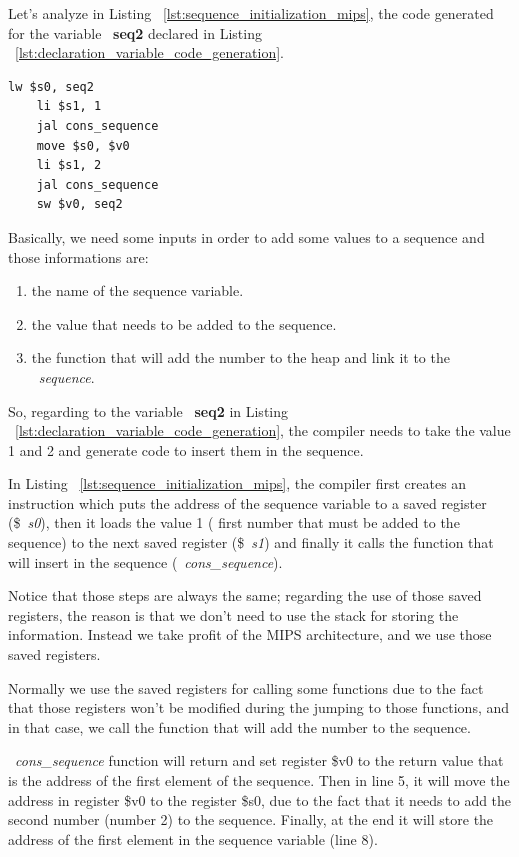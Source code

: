\documentclass[
  oneside,
  11pt, a4paper,
  footinclude=true,
  headinclude=true,
  cleardoublepage=empty
]{scrbook}
\begin{document}
Let's analyze in Listing ~\ref{lst:sequence_initialization_mips}, the code generated for the variable ~\textbf{seq2} declared in Listing ~\ref{lst:declaration_variable_code_generation}.

\begin{lstlisting}[caption={Code generated for the sequence variable},label={lst:sequence_initialization_mips}]
 	lw $s0, seq2		
	li $s1, 1		
	jal cons_sequence		
	move $s0, $v0		
	li $s1, 2		
	jal cons_sequence		
	sw $v0, seq2		
\end{lstlisting}

Basically, we need some  inputs in order to add some values to a sequence and those informations are:
\begin{enumerate}
\item the name of the sequence variable.
\item the value that needs to be added to the sequence.
\item the function that will add the number to the heap and link it to the ~\textit{sequence}.
\end{enumerate}

So, regarding to the variable ~\textbf{seq2} in Listing ~\ref{lst:declaration_variable_code_generation}, the compiler needs to take the value 1 and 2 and generate code to insert them in the sequence.

In Listing ~\ref{lst:sequence_initialization_mips}, the compiler first creates an instruction which puts the address of the sequence variable to a saved register (\$~\textit{s0}), then it loads the value 1 ( first number that must be added to the sequence) to the next saved register (\$~\textit{s1}) and finally it calls the function that will insert in the sequence (~\textit{cons\_sequence}).

Notice that those steps are always the same; regarding the use of those saved registers, the reason is that we don't need to use the stack for storing the information. Instead we take profit of the MIPS architecture, and we use those saved registers. 

Normally we use the saved registers for calling some functions due to the fact that those registers won't be modified during the jumping to those functions, and in that case, we call the function that will add the number to the sequence.

~\textit{cons\_sequence} function will return and set register \$v0 to the return value that is the address of the first element of the sequence. Then in line 5, it will move the address in register \$v0 to the register \$s0, due to the fact that it needs to add the second number (number 2) to the sequence. Finally, at the end it will store the address of the first element in the sequence variable (line 8).
\end{document}
